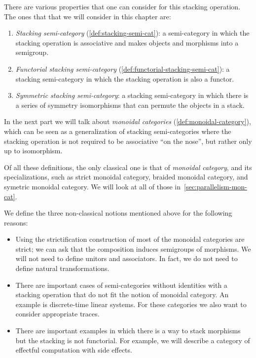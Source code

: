 There are various properties that one can consider for this stacking operation.
The ones that that we will consider in this chapter are:
%
\begin{enumerate}
    \item \emph{Stacking semi-category} (\cref{def:stacking-semi-cat}): a semi-category in which the stacking operation is associative and makes objects and morphisms into a semigroup.
    \item \emph{Functorial stacking semi-category} (\cref{def:functorial-stacking-semi-cat}): a stacking semi-category in which the stacking operation is also a functor.
    \item \emph{Symmetric stacking semi-category}: a stacking semi-category in which there is a series of symmetry isomorphisms that can permute the objects in a stack.
\end{enumerate}
%
In the next part we will talk about \emph{monoidal categories} (\cref{def:monoidal-category}), which can be seen as a generalization of stacking semi-categories where the stacking operation is not required to be associative ``on the nose'', but rather only up to isomorphism.

\begin{remark}
    Of all these definitions, the only classical one is that of \emph{monoidal category}, and its specializations, such as strict monoidal category, braided monoidal category, and symetric monoidal category.
    We will look at all of those in~\cref{sec:parallelism-mon-cat}.

    We define the three non-classical notions mentioned above for the following reasons:
    \begin{itemize}
        \item Using the strictification construction of \SetStar most of the monoidal categories are strict; we can ask that the composition induces semigroups of morphisms.
              We will not need to define unitors and associators.
              In fact, we do not need to define natural transformations.
        \item There are important cases of semi-categories without identities with a stacking operation that do not fit the notion of monoidal category.
              An example is discrete-time linear systems.
              For these categories we also want to consider appropriate traces.
        \item There are important examples in which there is a way to stack morphisms but the stacking is not functorial.
              For example, we will describe a category of effectful computation with side effects.
    \end{itemize}
\end{remark}

